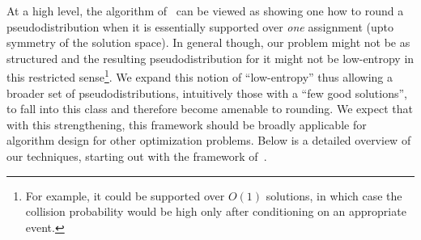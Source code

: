 At a high level, the algorithm of~\cite{BBKSS} can be viewed as showing one how to round a pseudodistribution when it is essentially supported over \emph{one} assignment (upto symmetry of the solution space). In general though, our problem might not be as structured and the resulting pseudodistribution for it might not be low-entropy in this restricted sense\footnote{For example, it could be supported over $O(1)$ solutions, in which case the collision probability would be high only after conditioning on an appropriate event.}. We expand this notion of ``low-entropy'' thus allowing a broader set of pseudodistributions, intuitively those with a ``few good solutions'', to fall into this class and therefore become amenable to rounding. We expect that with this strengthening, this framework  should be broadly applicable for algorithm design for other optimization problems. Below is a detailed overview of our techniques, starting out with the framework of~\cite{BBKSS}.



